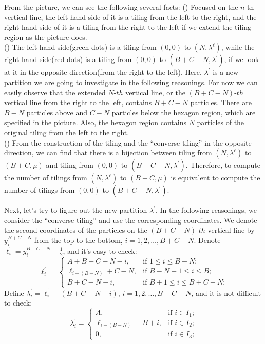 \documentclass[12pt]{article}
\begin{document}
	From the picture, we can see the following several facts:
	() Focused on the $n$-th vertical line, the left hand side of it is a tiling from the left to the right, and the right hand side of it is a tiling from the right to the left if we extend the tiling region as the picture does.\\
	() The left hand side(green dots) is a tiling from $(0,0)$ to $(N,\lambda^{\ell})$, while the right hand side(red dots) is a tiling from $(0,0)$ to $(B+C-N,\lambda^{\prime})$, if we look at it in the opposite direction(from the right to the left). Here, $\lambda^{\prime}$ is a new partition we are going to investigate in the following reasonings. For now we can easily observe that the extended $N$-$th$ vertical line, or the $(B+C-N)$-$th$ vertical line from the right to the left, contains $B+C-N$ particles. There are $B-N$ particles above and $C-N$ particles below the hexagon region, which are specified in the picture. Also, the hexagon region contains $N$ particles of the original tiling from the left to the right.\\
	() From the construction of the tiling and the ``converse tiling'' in the opposite direction, we can find that there is a bijection between tiling from $(N,\lambda^{\ell})$ to $(B+C,\mu)$ and tiling from $(0,0)$ to $(B+C-N,\lambda^{\prime})$. Therefore, to compute the number of tilings from $(N,\lambda^{\ell})$ to $(B+C,\mu)$ is equivalent to compute the number of tilings from $(0,0)$ to $(B+C-N,\lambda^{\prime})$.\\
	\par Next, let's try to figure out the new partition $\lambda^{\prime}$. In the following reasonings, we consider the ``converse tiling'' and use the corresponding coordinates. We denote the second coordinates of the particles on the $(B+C-N)$-$th$ vertical line by $y^{B+C-N}_{i}$ from the top to the bottom, $i=1,2,\dots,B+C-N$. Denote $\ell^{\prime}_{i}=y^{B+C-N}_{i}-\frac{1}{2}$, and it's easy to check: 
	$$
	\ell^{\prime}_{i}=
	\begin{cases}
	A+B+C-N-i, &\text{if $1\leqslant i\leqslant B-N$;} \\
	\ell_{i-(B-N)}+C-N, &\text{if $B-N+1\leqslant i\leqslant B$;}\\
	B+C-N-i, &\text{if $B+1\leqslant i\leqslant B+C-N$;}
	\end{cases}
	$$
	Define $\lambda_{i}^{\prime}=\ell_{i}^{\prime}-(B+C-N-i)$, $i=1,2,\dots,B+C-N$, and it is not difficult to check:
	$$
	\lambda^{\prime}_{i}=
	\begin{cases}
	A, &\text{if $i\in I_{1}$;} \\
	\ell_{i-(B-N)}-B+i, &\text{if $i\in I_{2}$;}\\
	0, &\text{if $i\in I_{3}$;}
	\end{cases}
	$$
\end{document}
